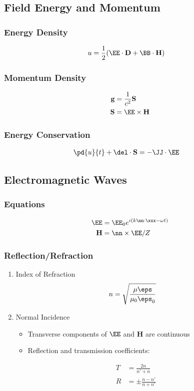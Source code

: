 \documentclass[11pt]{article}
\renewcommand{\HH}{\mathbf{H}}
\newcommand{\DD}{\mathbf{D}}
\renewcommand{\SS}{\mathbf{S}}
\begin{document}
\subsection{Field Energy and Momentum}
\label{sec:orga567ae4}
\subsubsection{Energy Density}
\label{sec:orge287a86}
\begin{align*}
u & = \frac{1}{2} (\EE \cdot \DD + \BB \cdot \HH)
\end{align*}
\subsubsection{Momentum Density}
\label{sec:org9cd4bb9}
\begin{align*}
\mathbf{g} & = \frac{1}{c^2} \SS \\
\SS & = \EE \times \HH
\end{align*}
\subsubsection{Energy Conservation}
\label{sec:org171c0a9}
\begin{align*}
\pd{u}{t} + \del \cdot \SS & = -\JJ \cdot \EE
\end{align*}
\subsection{Electromagnetic Waves}
\label{sec:orgb306a65}
\subsubsection{Equations}
\label{sec:orgb1a15c4}
\begin{align*}
\EE & = \EE_0 e^{i(k \nn \cdot \xxx - \omega t)} \\
\HH & = \nn \times \EE / Z
\end{align*}
\subsubsection{Reflection/Refraction}
\label{sec:org50a0975}
\begin{enumerate}
\item Index of Refraction
\label{sec:org3b4a2ff}
\begin{align*}
n & = \sqrt{\frac{\mu \eps}{\mu_0 \eps_0}}
\end{align*}
\item Normal Incidence
\label{sec:org8d2b40c}
\begin{itemize}
\item Transverse components of \(\EE\) and \(\HH\) are continuous
\item Reflection and transmission coefficients:
\end{itemize}
\begin{align*}
T & = \frac{2n}{n' + n} \\
R & = \pm \frac{n-n'}{n+n'} \\
\end{align*}
\end{enumerate}
\end{document}
